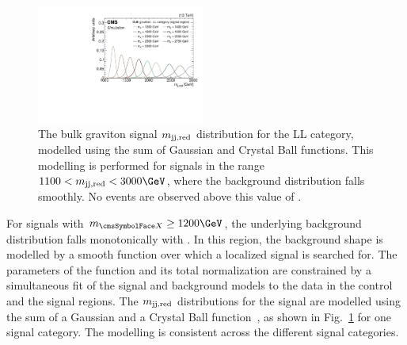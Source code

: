 \begin{figure}
\centering
\includegraphics[width=0.49\textwidth]{B2G-16-026/Figure_004.pdf}
\caption{The bulk graviton signal $m_{\text{jj,red}}$ distribution
  for the LL category, modelled using the sum of Gaussian and Crystal Ball
  functions. This modelling is performed for signals in the range $1100 < \mjjs <
  3000\GeV$, where the background distribution falls smoothly. No events are observed above this value of \mjjs.}
\label{fig:sigmodel}
\end{figure}

For signals with $\mx \ge 1200\GeV$, the underlying background distribution falls monotonically with \mjjs.
In this region, the background shape is modelled by a smooth function over which a localized signal is searched for.
The parameters of the function and its total normalization are constrained by a simultaneous fit of the signal and background models to the data in the control and the signal regions.
The $m_{\text{jj,red}}$ distributions for the signal are modelled using the sum of
a Gaussian and a Crystal Ball function~\cite{Oreglia:1980cs},
as shown in Fig.~\ref{fig:sigmodel} for one signal category.
The modelling is consistent across the different signal categories.

